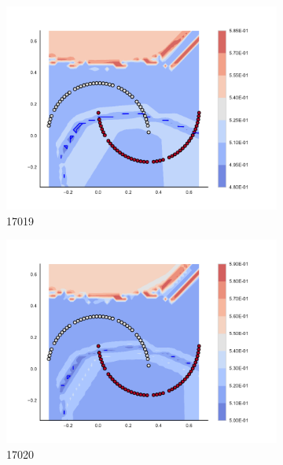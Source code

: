 \begin{figure}[h]
\begin{subfigure}[b]{0.09\textwidth}
    \includegraphics[clip, trim=2.35cm 1.75cm 4.5cm 0cm,width=\textwidth]{img/convergence/17019.pdf}
    \caption{17019}
    \label{fig:convergence_17019}
\end{subfigure}
%
\begin{subfigure}[b]{0.09\textwidth}
    \includegraphics[clip, trim=2.35cm 1.75cm 4.5cm 0cm,width=\textwidth]{img/convergence/17020.pdf}
    \caption{17020}
    \label{fig:convergence_17020}
\end{subfigure}
%
\begin{subfigure}[b]{0.09\textwidth}

\end{subfigure}
\end{figure}
